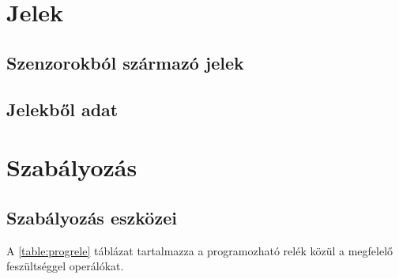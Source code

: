 \section{Jelek}

\subsection{Szenzorokból származó jelek}

\subsection{Jelekből adat}


\section{Szabályozás}

\subsection{Szabályozás eszközei}

A \ref{table:progrele} táblázat tartalmazza a programozható relék közül a megfelelő feszültséggel operálókat.

